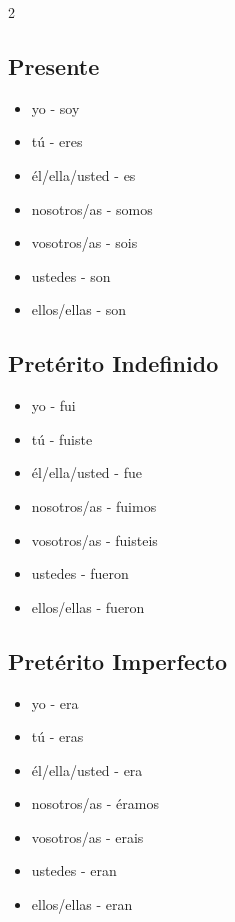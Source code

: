 \documentclass[12pt,a4paper]{article}
\begin{document}
\begin{multicols}{2}

\subsection*{Presente}
\begin{itemize}[leftmargin=*]
    \item yo - soy
    \item tú - eres
    \item él/ella/usted - es
    \item nosotros/as - somos
    \item vosotros/as - sois
    \item ustedes - son
    \item ellos/ellas - son
\end{itemize}

\subsection*{Pretérito Indefinido}
\begin{itemize}[leftmargin=*]
    \item yo - fui
    \item tú - fuiste
    \item él/ella/usted - fue
    \item nosotros/as - fuimos
    \item vosotros/as - fuisteis
    \item ustedes - fueron
    \item ellos/ellas - fueron
\end{itemize}

\subsection*{Pretérito Imperfecto}
\begin{itemize}[leftmargin=*]
    \item yo - era
    \item tú - eras
    \item él/ella/usted - era
    \item nosotros/as - éramos
    \item vosotros/as - erais
    \item ustedes - eran
    \item ellos/ellas - eran
\end{itemize}

\columnbreak


\end{multicols}
\end{document}
